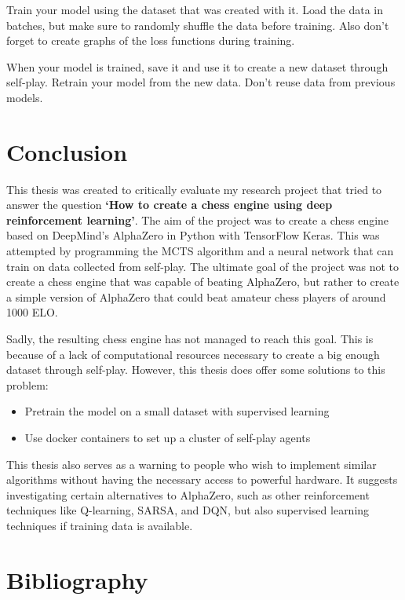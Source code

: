 \documentclass{article}
\begin{document}
Train your model using the dataset that was created with it. Load the data in batches, but make sure to 
randomly shuffle the data before training. Also don't forget to create graphs of the loss functions during training.

When your model is trained, save it and use it to create a new dataset through self-play. 
Retrain your model from the new data. Don't reuse data from previous models.

\newpage
\section{Conclusion}

This thesis was created to critically evaluate my research project that tried to 
answer the question \textbf{`How to create a chess engine using deep reinforcement learning'}.
The aim of the project was to create a chess engine based on DeepMind's AlphaZero in
Python with TensorFlow Keras. This was attempted by programming the MCTS algorithm 
and a neural network that can train on data collected from self-play. 
The ultimate goal of the project was not to create a chess engine that was capable of 
beating AlphaZero, but rather to create a simple version of AlphaZero that could 
beat amateur chess players of around 1000 ELO. 

Sadly, the resulting chess engine has not managed to reach this goal.
This is because of a lack of computational resources necessary to create a big enough
dataset through self-play. However, this thesis does offer some solutions to this problem:

\begin{itemize}
    \item Pretrain the model on a small dataset with supervised learning
    \item Use docker containers to set up a cluster of self-play agents
\end{itemize}

This thesis also serves as a warning to people who wish to implement similar algorithms
without having the necessary access to powerful hardware. It suggests investigating certain 
alternatives to AlphaZero, such as other reinforcement techniques like Q-learning, SARSA, and DQN,
but also supervised learning techniques if training data is available.




\newpage
\section{Bibliography}
\renewcommand{\bibname}{}
\printbibliography[heading=none]
\end{document}
